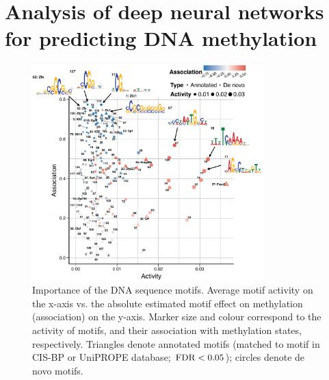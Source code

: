 
\chapter{Analysis of deep neural networks for predicting DNA methylation}

\ifpdf
    \graphicspath{{Chapter5/Figs/Raster/}{Chapter5/Figs/PDF/}{Chapter5/Figs/}}
\else
    \graphicspath{{Chapter5/Figs/Vector/}{Chapter5/Figs/}}
\fi

\begin{figure}[htbp!]
\centering
\includegraphics[width=0.8\textwidth]{motifs_imp}
\caption[Importance of the DNA sequence motifs.]{Importance of the DNA sequence motifs. Average motif activity on the x-axis vs. the absolute estimated motif effect on methylation (association) on the y-axis. Marker size and colour correspond to the activity of motifs, and their association with methylation states, respectively. Triangles denote annotated motifs (matched to motif in CIS-BP or UniPROPE database; $\operatorname{FDR}<0.05$); circles denote de novo motifs.}
\label{fig:dcpg_motifs_imp}
\end{figure}

